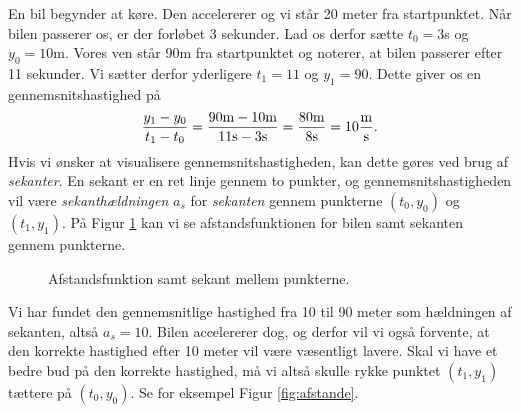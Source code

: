 \begin{exa}
	En bil begynder at køre. Den accelererer og vi står 20 meter fra startpunktet. Når bilen passerer os, er 
	der forløbet 3 sekunder. Lad os derfor sætte $t_0 = 3$s og $y_0 = 10$m. Vores ven står 90m fra 
	startpunktet og noterer, at bilen passerer efter 11 sekunder. Vi sætter derfor yderligere 
	$t_1 = 11$ og $y_1 = 90$. Dette giver os en gennemsnitshastighed på
	\begin{align*}
		\frac{y_1-y_0}{t_1-t_0} = \frac{90\textnormal{m}-10\textnormal{m}}{11\textnormal{s}-3\textnormal{s}} 
		=\frac{80\textnormal{m}}{8\textnormal{s}} = 10\frac{\textnormal{m}}{\textnormal{s}}.
	\end{align*}
	Hvis vi ønsker at visualisere gennemsnitshastigheden, kan dette gøres ved brug af \textit{sekanter}. En 
	sekant er en ret linje gennem to punkter, og gennemsnitshastigheden vil være \textit{sekanthældningen} 
	$a_s$ for \textit{sekanten} gennem punkterne  $(t_0,y_0)$ og $(t_1,y_1)$. 
	På Figur \ref{fig:sekant} kan vi se afstandsfunktionen for bilen samt sekanten gennem punkterne. 
	\begin{figure}[H]
		\centering
		\caption{Afstandsfunktion samt sekant mellem punkterne.}
		\label{fig:sekant}
	\end{figure}
	Vi har fundet den gennemsnitlige hastighed fra 10 til 90 meter som hældningen af sekanten, altså 
	$a_s = 10$. Bilen accelererer dog, og derfor vil vi også forvente, at den korrekte hastighed efter 10 meter 
	vil være væsentligt lavere. Skal vi have et bedre bud på den korrekte hastighed, må vi altså skulle 
	rykke punktet $(t_1,y_1)$ tættere på $(t_0,y_0)$. Se for eksempel Figur \ref{fig:afstande}.

\end{exa}
